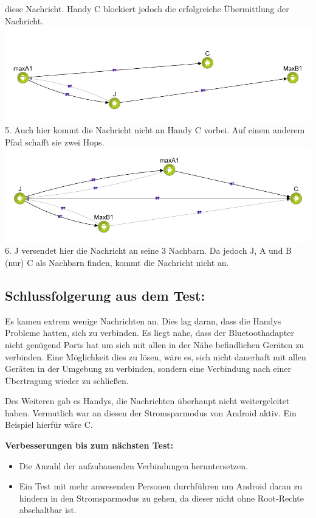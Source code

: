 diese Nachricht. Handy C blockiert jedoch die erfolgreiche Übermittlung
der Nachricht. \includegraphics{belege/grosstests/Bilder/Miserfolg2.jpg}
5. Auch hier kommt die Nachricht nicht an Handy C vorbei. Auf einem
anderem Pfad schafft sie zwei Hops.
\includegraphics{belege/grosstests/Bilder/Miserfolg1.jpg} 6. J versendet
hier die Nachricht an seine 3 Nachbarn. Da jedoch J, A und B (nur) C als
Nachbarn finden, kommt die Nachricht nicht an.

\clearpage\subsection{Schlussfolgerung aus dem
Test:}\label{schlussfolgerung-aus-dem-test}

Es kamen extrem wenige Nachrichten an. Dies lag daran, dass die Handys
Probleme hatten, sich zu verbinden. Es liegt nahe, dass der
Bluetoothadapter nicht genügend Ports hat um sich mit allen in der Nähe
befindlichen Geräten zu verbinden. Eine Möglichkeit dies zu lösen, wäre
es, sich nicht dauerhaft mit allen Geräten in der Umgebung zu verbinden,
sondern eine Verbindung nach einer Übertragung wieder zu schließen.

Des Weiteren gab es Handys, die Nachrichten überhaupt nicht
weitergeleitet haben. Vermutlich war an diesen der Stromsparmodus von
Android aktiv. Ein Beispiel hierfür wäre C.

\textbf{Verbesserungen bis zum nächsten Test:}

\begin{itemize}
\tightlist
\item
  Die Anzahl der aufzubauenden Verbindungen heruntersetzen.
\item
  Ein Test mit mehr anwesenden Personen durchführen um Android daran zu
  hindern in den Stromsparmodus zu gehen, da dieser nicht ohne
  Root-Rechte abschaltbar ist.
\end{itemize}

